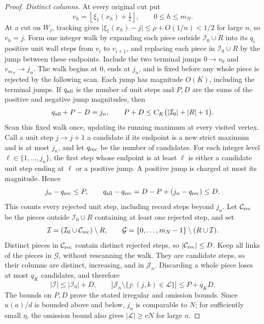 \begin{proof}
\emph{Distinct columns.}
At every original cut put
\[
 v_h=\left\lfloor \xi_1(x_h)+\tfrac12\right\rfloor,
 \qquad 0\le h\le m_N.
\]
At a cut on \(W_j\), tracking gives
\(\lvert \xi_1(x_h)-j\rvert\le\rho+O(1/n)<1/2\) for large \(n\),
so \(v_h=j\). Form one integer walk by expanding each piece outside
\(\mathcal I_0\cup R\) into its \(q_i\) positive unit wall steps from
\(v_i\) to \(v_{i+1}\), and replacing each piece in
\(\mathcal I_0\cup R\) by the jump between these endpoints. Include
the two terminal jumps \(0\to v_0\) and \(v_{m_N}\to j_n\).
The walk begins at \(0\), ends at \(j_n\), and is fixed before any
whole piece is rejected by the following scan. Each jump has magnitude
\(O(K)\), including the terminal jumps. If \(q_{\rm all}\) is the
number of unit steps and \(P,D\) are the sums of the positive and
negative jump magnitudes, then
\[
 q_{\rm all}+P-D=j_n,\qquad
 P+D\le C_K\bigl(|\mathcal I_0|+|R|+1\bigr).
\]
Scan this fixed walk once, updating its running maximum at every
visited vertex. Call a unit step \(j\to j+1\) a candidate if its
endpoint is a new strict maximum and is at most \(j_n\), and let
\(q_{\rm rec}\) be the number of candidates. For each integer level
\(\ell\in\{1,\ldots,j_n\}\), the first step whose endpoint is at least
\(\ell\) is either a candidate unit step ending at \(\ell\) or a
positive jump. A positive jump is charged at most its magnitude. Hence
\[
 j_n-q_{\rm rec}\le P,\qquad
 q_{\rm all}-q_{\rm rec}
   =D-P+(j_n-q_{\rm rec})\le D.
\]
This counts every rejected unit step, including record steps beyond
\(j_n\). Let \(\mathcal C_{\rm rec}\) be the pieces outside
\(\mathcal I_0\cup R\) containing at least one rejected step, and set
\[
 \mathcal I=(\mathcal I_0\cup\mathcal C_{\rm rec})\setminus R,
 \qquad
 \mathcal G=\{0,\ldots,m_N-1\}\setminus(R\cup\mathcal I).
\]
Distinct pieces in \(\mathcal C_{\rm rec}\) contain distinct rejected
steps, so \(\lvert\mathcal C_{\rm rec}\rvert\le D\). Keep all links of
the pieces in \(\mathcal G\), without rescanning the walk. They are
candidate steps, so their columns are distinct, increasing, and in
\(\mathcal J_n\). Discarding a whole piece loses at most \(q_K\)
candidates, and therefore
\[
 |\mathcal I|\le|\mathcal I_0|+D,\qquad
 |\mathcal J_n\setminus\{j:(j,k)\in\mathcal L\}|
 \le P+q_KD.
\]
The bounds on \(P,D\) prove the stated irregular and omission bounds.
Since \(u(a)/d\) is bounded above and below, \(j_n\) is comparable
to \(N\); for sufficiently small \(\eta\), the omission bound also
gives \(\lvert\mathcal L\rvert\ge cN\) for large \(n\).


\end{proof}
